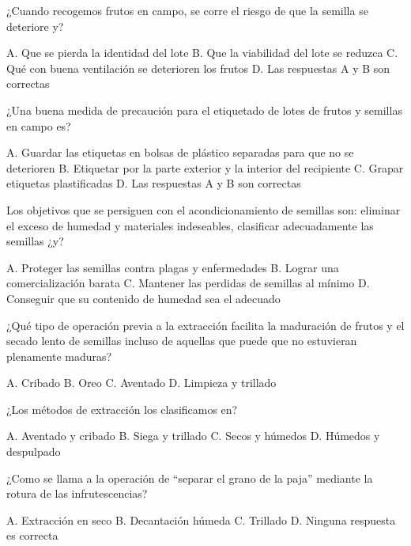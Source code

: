 \documentclass[11pt]{exam}
\begin{document}
{\begin{questions}
\question ¿Cuando recogemos frutos en campo, se corre el riesgo de que la semilla
  se deteriore y?
  \begin{checkboxes}
    \choice A. Que se pierda la identidad del lote
    \choice B. Que la viabilidad del lote se reduzca
    \choice C. Qué con buena ventilación se deterioren los frutos
    \CorrectChoice D. Las respuestas A y B son correctas
  \end{checkboxes}
\question ¿Una buena medida de precaución para el etiquetado de lotes de frutos y semillas
  en campo es?
  \begin{checkboxes}
    \choice A. Guardar las etiquetas en bolsas de plástico separadas para que no se
    deterioren
    \CorrectChoice B. Etiquetar por la parte exterior y la interior del recipiente
    \choice C. Grapar etiquetas plastificadas
    \choice D. Las respuestas A y B son correctas
  \end{checkboxes}
\question Los objetivos que se persiguen con el acondicionamiento de semillas son:
  eliminar el exceso de humedad y materiales indeseables, clasificar adecuadamente las
  semillas ¿y?
  \begin{checkboxes}
    \CorrectChoice A. Proteger las semillas contra plagas y enfermedades
    \choice B. Lograr una comercialización barata
    \choice C. Mantener las perdidas de semillas al mínimo
    \choice D. Conseguir que su contenido de humedad sea el adecuado
  \end{checkboxes}
\question ¿Qué tipo de operación previa a la extracción facilita la maduración de frutos
  y el secado lento de semillas incluso de aquellas que puede que no estuvieran plenamente
  maduras?
  \begin{checkboxes}
    \choice A. Cribado
    \CorrectChoice B. Oreo 
    \choice C. Aventado
    \choice D. Limpieza y trillado
  \end{checkboxes}
\question ¿Los métodos de extracción los clasificamos en?
  \begin{checkboxes}
    \choice A. Aventado y cribado
    \choice B. Siega y trillado
    \CorrectChoice C. Secos y húmedos
    \choice D. Húmedos y despulpado
  \end{checkboxes}
  \newpage
\question ¿Como se llama a la operación de ``separar el grano de la paja'' mediante la
  rotura de las infrutescencias?
  \begin{checkboxes}
    \choice A. Extracción en seco
    \choice B. Decantación húmeda
    \CorrectChoice C. Trillado
    \choice D. Ninguna respuesta es correcta 

\end{checkboxes}
\end{questions}}
\end{document}
